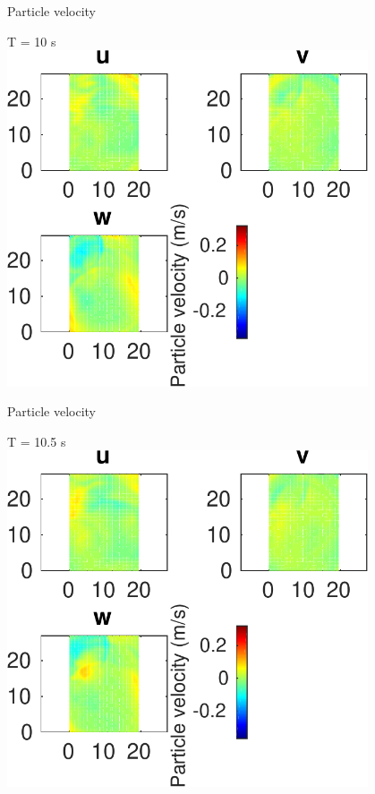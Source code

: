 \documentclass{beamer}
\begin{document}
\begin{frame}
 {Particle velocity}
 
 \centering \Large T = 10 s\\
 \includegraphics[width=0.8\textwidth]{images/horizontal_velo_00106}
 
\end{frame}

\begin{frame}
 {Particle velocity}
 
 \centering \Large T = 10.5 s\\
 \includegraphics[width=0.8\textwidth]{images/horizontal_velo_00111}
 
\end{frame}
\end{document}
